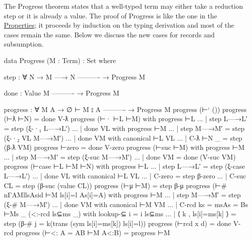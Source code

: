 The Progress theorem states that a well-typed term may either take a
reduction step or it is already a value. The proof of Progress is like
the one in the \protect\hyperlink{Properties}{Properties}; it proceeds
by induction on the typing derivation and most of the cases remain the
same. Below we discuss the new cases for records and subsumption.

\begin{fence}
\begin{code}
data Progress (M : Term) : Set where

  step : ∀ {N}
    → M —→ N
      ----------
    → Progress M

  done :
      Value M
      ----------
    → Progress M
\end{code}
\end{fence}

\begin{fence}
\begin{code}
progress : ∀ {M A}
  → ∅ ⊢ M ⦂ A
    ----------
  → Progress M
progress (⊢` ())
progress (⊢ƛ ⊢N)                            = done V-ƛ
progress (⊢· ⊢L ⊢M)
    with progress ⊢L
... | step L—→L′                            = step (ξ-·₁ L—→L′)
... | done VL
        with progress ⊢M
...     | step M—→M′                        = step (ξ-·₂ VL M—→M′)
...     | done VM
        with canonical ⊢L VL
...     | C-ƛ ⊢N _                          = step (β-ƛ VM)
progress ⊢zero                              =  done V-zero
progress (⊢suc ⊢M) with progress ⊢M
...  | step M—→M′                           =  step (ξ-suc M—→M′)
...  | done VM                              =  done (V-suc VM)
progress (⊢case ⊢L ⊢M ⊢N) with progress ⊢L
... | step L—→L′                            =  step (ξ-case L—→L′)
... | done VL with canonical ⊢L VL
...   | C-zero                              =  step β-zero
...   | C-suc CL                            =  step (β-suc (value CL))
progress (⊢μ ⊢M)                            =  step β-μ
progress (⊢# {n}{Γ}{A}{M}{l}{ls}{As}{i}{d} ⊢M ls[i]=l As[i]=A)
    with progress ⊢M
... | step M—→M′                            =  step (ξ-# M—→M′)
... | done VM
    with canonical ⊢M VM
... | C-rcd {ks = ms}{As = Bs} ⊢Ms _ (<:-rcd ls⊆ms _)
    with lookup-⊆ {i = i} ls⊆ms
... | ⟨ k , ls[i]=ms[k] ⟩                   =  step (β-# {j = k}(trans (sym ls[i]=ms[k]) ls[i]=l))
progress (⊢rcd x d)                         =  done V-rcd
progress (⊢<: {A = A}{B} ⊢M A<:B)           =  progress ⊢M
\end{code}
\end{fence}


